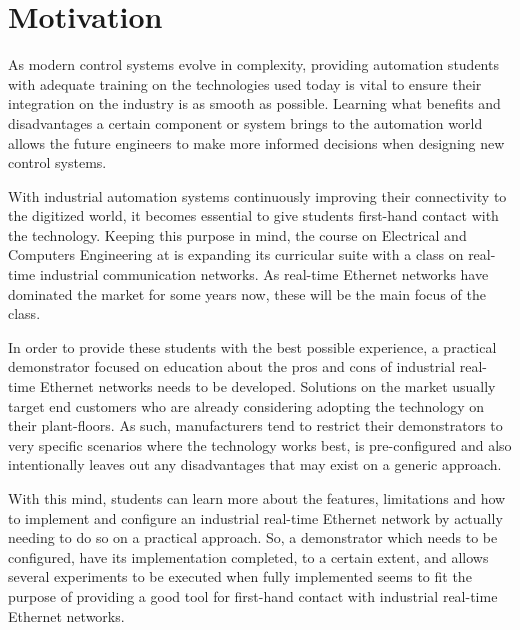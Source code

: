 \section{Motivation} \label{sec:motivation}

As modern control systems evolve in complexity, providing automation students with adequate training on the technologies used today is vital to ensure their integration on the industry is as smooth as possible.
Learning what benefits and disadvantages a certain component or system brings to the automation world allows the future engineers to make more informed decisions when designing new control systems.

With industrial automation systems continuously improving their connectivity to the digitized world, it becomes essential to give students first-hand contact with the technology.
Keeping this purpose in mind, the course on Electrical and Computers Engineering at \Feup{} is expanding its curricular suite with a class on real-time industrial communication networks.
As real-time Ethernet networks have dominated the market for some years now, these will be the main focus of the class.

In order to provide these students with the best possible experience, a practical demonstrator focused on education about the pros and cons of industrial real-time Ethernet networks needs to be developed.
Solutions on the market usually target end customers who are already considering adopting the technology on their plant-floors.
As such, manufacturers tend to restrict their demonstrators to very specific scenarios where the technology works best, is pre-configured and also intentionally leaves out any disadvantages that may exist on a generic approach.

With this mind, students can learn more about the features, limitations and how to implement and configure an industrial real-time Ethernet network by actually needing to do so on a practical approach.
So, a demonstrator which needs to be configured, have its implementation completed, to a certain extent, and allows several experiments to be executed when fully implemented seems to fit the purpose of providing a good tool for first-hand contact with industrial real-time Ethernet networks.
